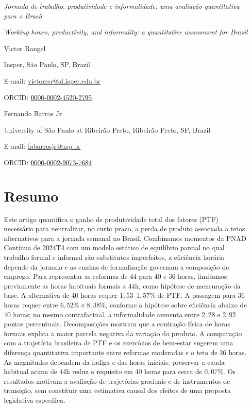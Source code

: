 \documentclass[12pt]{article}
\begin{document}
\begin{center}
{\normalsize\itshape Jornada de trabalho, produtividade e informalidade: uma avalia\c{c}\~ao quantitativa para o Brasil\par}

\vspace{0.8em}
{\normalsize\itshape Working hours, productivity, and informality: a quantitative assessment for Brazil\par}

\vspace{1.5em}
{\normalsize Victor Rangel\par}
Insper, São Paulo, SP, Brazil\par
E-mail: \href{mailto:victorrsr@al.isper.edu.br}{victorrsr@al.isper.edu.br}\par
ORCID: \href{https://orcid.org/0000-0002-4520-2795}{0000-0002-4520-2795}

\vspace{0.8em}
{\normalsize Fernando Barros Jr\par}
University of São Paulo at Ribeirão Preto, Ribeirão Preto, SP, Brazil\par
E-mail: \href{mailto:fabarrosjr@usp.br}{fabarrosjr@usp.br}\par
ORCID: \href{https://orcid.org/0000-0002-9073-7684}{0000-0002-9073-7684}\par
\end{center}

\section*{Resumo}

 Este artigo quantifica o ganho de produtividade total dos fatores (PTF) necessário para neutralizar, no curto prazo, a perda de produto associada a tetos alternativos para a jornada semanal no Brasil. Combinamos momentos da PNAD Contínua de 2024T4 com um modelo estático de equilíbrio parcial no qual trabalho formal e informal são substitutos imperfeitos, a eficiência horária depende da jornada e as cunhas de formalização governam a composição do emprego. Para representar as reformas de 44 para 40 e 36 horas, limitamos previamente as horas habituais formais a 44h, como hipótese de mensuração da base. A alternativa de 40 horas requer $1{,}53$--$1{,}57\%$ de PTF. A passagem para 36 horas requer entre $6{,}52\%$ e $8{,}38\%$, conforme a hipótese sobre eficiência abaixo de 40 horas; no mesmo contrafactual, a informalidade aumenta entre $2{,}28$ e $2{,}92$ pontos percentuais. Decomposições mostram que a contração física de horas formais explica a maior parcela negativa da variação do produto. A comparação com a trajetória brasileira de PTF e os exercícios de bem-estar sugerem uma diferença quantitativa importante entre reformas moderadas e o teto de 36 horas. As magnitudes dependem da fadiga e das horas iniciais: preservar a cauda habitual acima de 44h reduz o requisito em 40 horas para cerca de $0{,}07\%$. Os resultados motivam a avaliação de trajetórias graduais e de instrumentos de transição, sem constituir uma estimativa causal dos efeitos de uma proposta legislativa específica.
\end{document}
